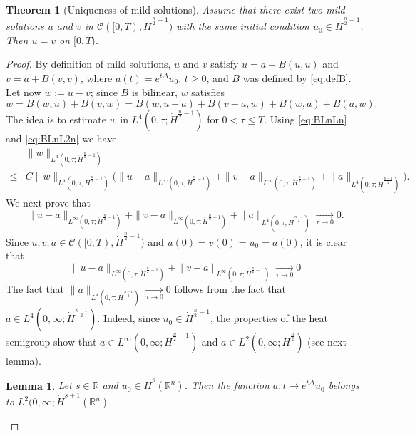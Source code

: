 \documentclass[a4paper, 12pt]{article}
\theoremstyle{plain}
\newtheorem{theorem}[proposition]{Theorem}
\newtheorem{lemma}[proposition]{Lemma}
\theoremstyle{definition}
\theoremstyle{remark}
\numberwithin{equation}{section}
\begin{document}
\begin{theorem}[Uniqueness of mild solutions]
\label{thm:uniquenessLn}
Assume that there exist two mild solutions $u$ and $v$ in ${\mathscr{C}}([0,T),\dot H^{\frac{n}{2}-1})$
with the same initial condition $u_0\in \dot H^{\frac{n}{2}-1}$. Then $u=v$ on $[0,T)$.
\end{theorem}

\begin{proof}
By definition of mild solutions, $u$ and $v$ satisfy
$u=a+B(u,u)$ and $v=a+B(v,v)$, where $a(t)=e^{t\Delta}u_0$, $t\ge 0$,  
and $B$ was defined by \eqref{eq:defB}.
Let now $w:=u-v$; since $B$ is bilinear, $w$ satisfies
\[
w=B(w,u)+B(v,w)=B(w,u-a)+B(v-a,w)+B(w,a)+B(a,w).
\]
The idea is to estimate $w$ in $L^4(0,\tau;\dot H^{\frac{n}{2}-1})$ for $0<\tau\le T$.
Using \eqref{eq:BLnLn} and \eqref{eq:BLnL2n} we have
%
\begin{align}
\label{eq:est-w}
&\|w\|_{L^4(0,\tau;\dot H^{\frac{n}{2}-1})}
\\
\le& C\|w\|_{L^4(0,\tau;\dot H^{\frac{n}{2}-1})}\bigl(\|u-a\|_{L^\infty(0,\tau;\dot H^{\frac{n}{2}-1})}+\|v-a\|_{L^\infty(0,\tau;\dot H^{\frac{n}{2}-1})}
+\|a\|_{L^4(0,\tau;\dot H^{\frac{n-1}{2}})}\bigr).
\nonumber
\end{align}
%
We next prove that 
\[
\|u-a\|_{L^\infty(0,\tau;\dot H^{\frac{n}{2}-1})}+\|v-a\|_{L^\infty(0,\tau;\dot H^{\frac{n}{2}-1})}
+\|a\|_{L^4(0,\tau;\dot H^{\frac{n-1}{2}})}\xrightarrow[\tau\to 0]{} 0.
\]
Since $u,v,a\in{\mathscr{C}}([0,T),\dot H^{\frac{n}{2}-1})$ and $u(0)=v(0)=u_0=a(0)$, it is clear that
\[
\|u-a\|_{L^\infty(0,\tau;\dot H^{\frac{n}{2}-1})}+\|v-a\|_{L^\infty(0,\tau;\dot H^{\frac{n}{2}-1})}
\xrightarrow[\tau\to 0]{} 0
\]
The fact that $\|a\|_{L^4(0,\tau;\dot H^{\frac{n-1}{2}})}\xrightarrow[\tau\to 0]{} 0$ follows from the fact
that $a\in L^4(0,\infty;\dot H^{\frac{n-1}{2}})$. Indeed, since $u_0\in \dot H^{\frac{n}{2}-1}$, the properties of the heat semigroup
show that $a\in L^\infty(0,\infty;\dot H^{\frac{n}{2}-1})$ and $a\in L^2(0,\infty;\dot H^{\frac{n}{2}})$ (see next lemma).

\begin{lemma}
\label{lem:L2H1}
Let $s\in{\mathds{R}}$ and $u_0\in\dot H^s({\mathds{R}}^n)$. Then the function $a:t\mapsto e^{t\Delta}u_0$ belongs to 
$L^2(0,\infty;\dot H^{s+1}({\mathds{R}}^n)$.
\end{lemma}


\end{proof}
\end{document}
